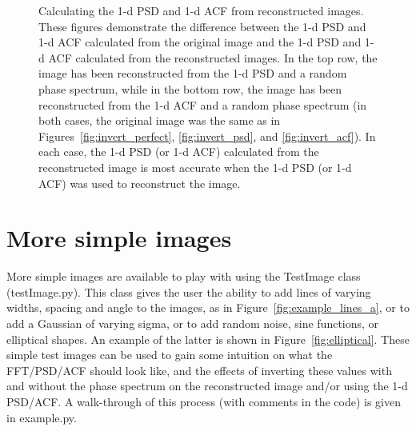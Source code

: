 \documentclass[11pt,preprint]{aastex}
\begin{document}
\begin{figure}[htbp]
\caption{{\small
Calculating the 1-d PSD and 1-d ACF from reconstructed images. These figures demonstrate the difference between the 1-d PSD and 1-d ACF calculated from the original image and the 1-d PSD and 1-d ACF calculated from the reconstructed images. In the top row, the image has been reconstructed from the 1-d PSD and a random phase spectrum, while in the bottom row, the image has been reconstructed from the 1-d ACF and a random phase spectrum (in both cases, the original image was the same as in Figures~\ref{fig:invert_perfect}, \ref{fig:invert_psd}, and \ref{fig:invert_acf}). In each case, the 1-d PSD (or 1-d ACF) calculated from the reconstructed image is most accurate when the 1-d PSD (or 1-d ACF) was used to reconstruct the image. }}
\label{fig:invert_compare1d}
\end{figure}


\section{More simple images}

More simple images are available to play with using the TestImage class (testImage.py). This class gives the user the ability to add lines of varying widths, spacing and angle to the images, as in Figure~\ref{fig:example_lines_a}, or to add a Gaussian of varying sigma, or to add random noise, sine functions, or elliptical shapes. An example of the latter is shown in Figure~\ref{fig:elliptical}.  These simple test images can be used to gain some intuition on what the FFT/PSD/ACF should look like, and the effects of inverting these values with and without the phase spectrum on the reconstructed image and/or using the 1-d PSD/ACF. A walk-through of this process (with comments in the code) is given in example.py.
\end{document}
